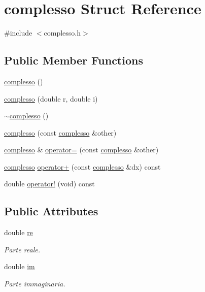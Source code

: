 \hypertarget{structcomplesso}{}\section{complesso Struct Reference}
\label{structcomplesso}


{\ttfamily \#include $<$complesso.\+h$>$}

\subsection*{Public Member Functions}
\begin{DoxyCompactItemize}
\item 
\mbox{\hyperlink{structcomplesso_ac8649cdc2a8bb50ab28b57745f3e5bb1}{complesso}} ()
\item 
\mbox{\hyperlink{structcomplesso_a05ead874809d0266245c2b1cb650ff6f}{complesso}} (double r, double i)
\item 
\mbox{\hyperlink{structcomplesso_a04d5503bbd98d2d0e25bec23d2b2e619}{$\sim$complesso}} ()
\item 
\mbox{\hyperlink{structcomplesso_af07bfd9970163010c92eb5bf7a150d85}{complesso}} (const \mbox{\hyperlink{structcomplesso}{complesso}} \&other)
\item 
\mbox{\hyperlink{structcomplesso}{complesso}} \& \mbox{\hyperlink{structcomplesso_a48a9213a9253054342ea512923847c84}{operator=}} (const \mbox{\hyperlink{structcomplesso}{complesso}} \&other)
\item 
\mbox{\hyperlink{structcomplesso}{complesso}} \mbox{\hyperlink{structcomplesso_aed83284e359857ed16b502af59b0cb66}{operator+}} (const \mbox{\hyperlink{structcomplesso}{complesso}} \&dx) const
\item 
double \mbox{\hyperlink{structcomplesso_a2a63410f0ab5c6c040fcd520a6dbf1ea}{operator!}} (void) const
\end{DoxyCompactItemize}
\subsection*{Public Attributes}
\begin{DoxyCompactItemize}
\item 
\mbox{\label{structcomplesso_a18f663f0e6dbf937ad021ee6be7dfd6d}} 
double \mbox{\hyperlink{structcomplesso_a18f663f0e6dbf937ad021ee6be7dfd6d}{re}}
\begin{DoxyCompactList}\small\item\em Parte reale. \end{DoxyCompactList}\item 
\mbox{\label{structcomplesso_aa39281c7cd586948f400de2fe6ce4582}} 
double \mbox{\hyperlink{structcomplesso_aa39281c7cd586948f400de2fe6ce4582}{im}}
\begin{DoxyCompactList}\small\item\em Parte immaginaria. \end{DoxyCompactList}\end{DoxyCompactItemize}


